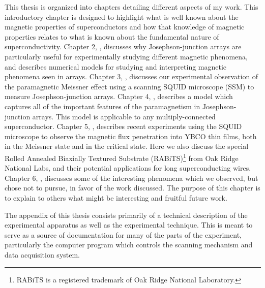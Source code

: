 This thesis is organized into chapters detailing different
aspects of my work. This introductory chapter is designed
to highlight what is well known about the magnetic properties
of superconductors and how that knowledge of magnetic properties
relates to what is known about the fundamental nature of
superconductivity. 
Chapter 2, , discusses
why Josephson-junction arrays are particularly useful for
experimentally studying different magnetic phenomena, and describes
numerical models
for studying and interpreting magnetic phenomena
seen in arrays. 
Chapter 3, 
, discusses our experimental 
observation of the paramagnetic Meissner effect using a scanning
SQUID microscope (SSM) to measure Josephson-junction arrays. 
Chapter 4, 
,
describes a model which
captures all of the important features of the paramagnetism in 
Josephson-junction arrays. This model is applicable to any 
multiply-connected superconductor. 
Chapter 5, 
, describes recent experiments using the 
SQUID microscope to observe the magnetic flux penetration into YBCO 
thin films, both in the Meissner state and in the critical state. 
Here we also discuss the special Rolled Annealed Biaxially 
Textured Substrate (RABiTS\trademark)\footnote{RABiTS is a registered 
trademark of Oak Ridge National Laboratory.} from Oak Ridge National Labs, 
and their potential applications for long superconducting 
wires. 
Chapter 6, ,
discusses some of the interesting phenomena which 
we observed, but chose not to pursue, in favor of the work discussed. 
The purpose of this
chapter is to explain to others what might be interesting and fruitful
future work. 

The appendix of this thesis consists primarily of a technical 
description of the experimental apparatus as well as the experimental
technique. This is meant to serve as a source of documentation 
for many of the parts of the experiment, particularly the 
computer program which controls the scanning mechanism and data
acquisition system. 

%
%
%

